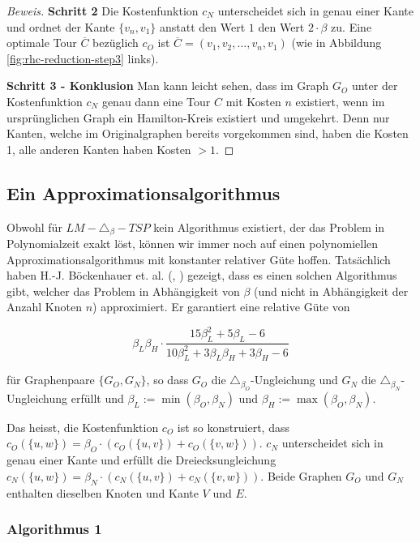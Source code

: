 \documentclass[a4paper,11pt]{scrreprt}
\begin{document}
\begin{proof}[Beweis]
\textbf{Schritt 2} Die Kostenfunktion $c_N$ unterscheidet sich in genau einer Kante und ordnet der Kante $\{v_n, v_1\}$ anstatt den Wert $1$ den Wert $2 \cdot \beta$ zu. Eine optimale Tour $\overline{C}$ bezüglich $c_O$ ist $\overline{C} = (v_1, v_2, \dots, v_n, v_1)$ (wie in Abbildung \ref{fig:rhc-reduction-step3} links).

\textbf{Schritt 3 - Konklusion} Man kann leicht sehen, dass im Graph $G_O$ unter der Kostenfunktion $c_N$ genau dann eine Tour $C$ mit Kosten $n$ existiert, wenn im ursprünglichen Graph ein Hamilton-Kreis existiert und umgekehrt. Denn nur Kanten, welche im Originalgraphen bereits vorgekommen sind, haben die Kosten 1, alle anderen Kanten haben Kosten $> 1$. 
\end{proof}

\subsection{Ein Approximationsalgorithmus}

Obwohl für $LM-\triangle_\beta-TSP$ kein Algorithmus existiert, der das Problem in Polynomialzeit exakt löst, können wir immer noch auf einen polynomiellen Approximationsalgorithmus mit konstanter relativer Güte hoffen. Tatsächlich haben H.-J. Böckenhauer et. al. (\cite{bok1}, \cite{bok2}) gezeigt, dass es einen solchen Algorithmus gibt, welcher das Problem in Abhängigkeit von $\beta$ (und nicht in Abhängigkeit der Anzahl Knoten $n$) approximiert. Er garantiert eine  relative Güte von

\[ \beta_L\beta_H \cdot \frac{15\beta_L^2 + 5\beta_L - 6}{10\beta_L^2 + 3\beta_L\beta_H + 3\beta_H -6} \]

für Graphenpaare $\{G_O, G_N\}$, so dass $G_O$ die $\triangle_{\beta_O}$-Ungleichung und $G_N$ die $\triangle_{\beta_N}$-Ungleichung erfüllt und $\beta_L := \min(\beta_O,\beta_N)$ und $\beta_H := \max(\beta_O,\beta_N)$. 

Das heisst, die Kostenfunktion $c_O$ ist so konstruiert, dass $c_O(\{u,w\}) = \beta_O \cdot (c_O(\{u,v\}) + c_O(\{v,w\}))$. $c_N$ unterscheidet sich in genau einer Kante und erfüllt die Dreiecksungleichung $c_N(\{u,w\}) = \beta_N \cdot (c_N(\{u,v\}) + c_N(\{v,w\}))$. Beide Graphen $G_O$ und $G_N$ enthalten dieselben Knoten und Kante $V$ und $E$.

\subsubsection{Algorithmus 1}
\end{document}
